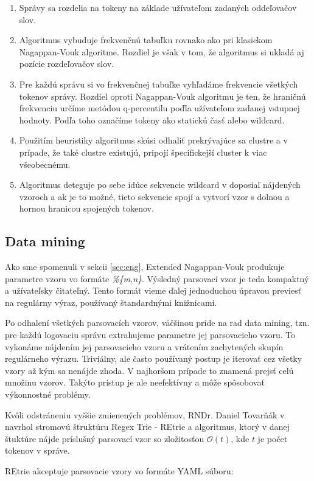 \begin{enumerate}
 \item Správy sa rozdelia na tokeny na základe užívateľom zadaných oddeľovačov slov.
 \item Algoritmus vybuduje frekvenčnú tabuľku rovnako ako pri klasickom Nagappan-Vouk algoritme. Rozdiel je však v tom, že algoritmus si ukladá aj pozície rozdeľovačov slov.
 \item Pre každú správu si vo frekvenčnej tabuľke vyhľadáme frekvencie všetkých tokenov správy. Rozdiel oproti Nagappan-Vouk algoritmu je ten, že hraničnú frekvenciu určíme metódou q-percentilu poďla užívateľom zadanej vstupnej hodnoty. Podľa toho označíme tokeny ako statickú časť alebo wildcard.
 \item Použitím heuristiky algoritmus skúsi odhaliť prekrývajúce sa clustre a v prípade, že také clustre existujú, pripojí špecifickejší cluster k viac všeobecnému.
 \item Algoritmus deteguje po sebe idúce sekvencie wildcard v doposiaľ nájdených vzoroch a ak je to možné, tieto sekvencie spojí a vytvorí
 vzor s dolnou a hornou hranicou spojených tokenov.
\end{enumerate}

\subsection{Data mining}
\label{sec:data-mining}
Ako sme spomenuli v sekcii \ref{sec:eng}, Extended Nagappan-Vouk produkuje parametre vzoru vo formáte \emph{\%\{m,n\}}. Výsledný parsovací vzor je teda kompaktný a užívateľsky čitateľný.  Tento formát vieme ďalej jednoduchou úpravou previesť na regulárny výraz, používaný štandardnými knižnicami.
\par Po odhalení všetkých parsovacích vzorov, väčšinou príde na rad data mining, tzn. pre každú logovaciu správu extrahujeme parametre jej parsovacieho vzoru. To vykonáme nájdením jej parsovacieho vzoru a vrátením zachytených skupín regulárneho výrazu. Triviálny, ale často používaný postup je iterovať cez všetky vzory až kým sa nenájde zhoda. V najhoršom prípade to znamená prejsť celú množinu vzorov. Takýto prístup je ale neefektívny a môže spôsobovať výkonnostné problémy. 
\par Kvôli odstráneniu vyššie zmienených problémov, RNDr. Daniel Tovarňák v \parencite{regextrie} navrhol stromovú štruktúru Regex Trie - REtrie a algoritmus, ktorý v danej štuktúre nájde príslušný parsovací vzor so zložitosťou $\mathcal{O}(t)$, kde $t$ je počet tokenov v správe. 
\par REtrie akceptuje parsovacie vzory vo formáte YAML súboru:

